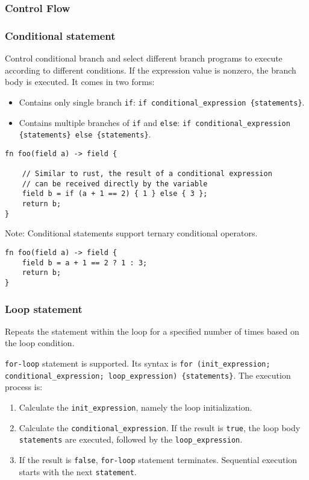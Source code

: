 \subsubsection{Control Flow}

\subsubsection*{Conditional statement}

Control conditional branch and select different branch programs to execute according to different conditions. 
If the expression value is nonzero, the branch body is executed.
It comes in two forms:

\begin{itemize}
    \item Contains only single branch \verb|if|: \verb|if conditional_expression {statements}|.
    \item Contains multiple branches of \verb|if| and \verb|else|: \verb|if conditional_expression {statements} else {statements}|.
\end{itemize}

\begin{lstlisting}
fn foo(field a) -> field {
    
    // Similar to rust, the result of a conditional expression 
    // can be received directly by the variable
    field b = if (a + 1 == 2) { 1 } else { 3 };
    return b;
}
\end{lstlisting}

Note: Conditional statements support ternary conditional operators.

\begin{lstlisting}
fn foo(field a) -> field {
    field b = a + 1 == 2 ? 1 : 3;
    return b;
}
\end{lstlisting}

\subsubsection*{Loop statement}

Repeats the statement within the loop for a specified number of times based on the loop condition.

\verb|for-loop| statement is supported. Its syntax is \verb|for (init_expression; conditional_expression; loop_expression) {statements}|. The execution process is:
\begin{enumerate}
    \item Calculate the \verb|init_expression|, namely the loop initialization.
    \item Calculate the \verb|conditional_expression|. If the result is \verb|true|, the loop body \verb|statements| are executed, followed by the \verb|loop_expression|.
    \item If the result is \verb|false|, \verb|for-loop| statement terminates. Sequential execution starts with the next \verb|statement|.
\end{enumerate}

